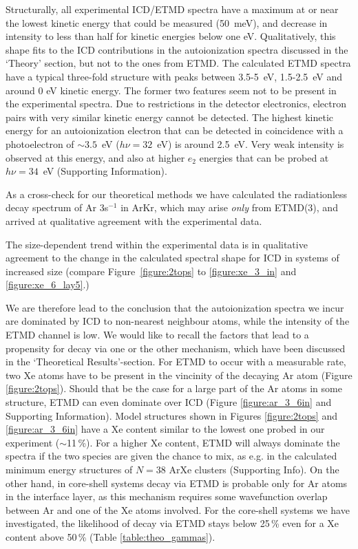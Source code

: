 Structurally, all experimental ICD/ETMD spectra have a maximum at or near the lowest kinetic energy that could be measured (50~meV), and decrease in intensity to less than half for kinetic energies below one eV. 
Qualitatively, this shape fits to the ICD contributions in the autoionization spectra discussed in the `Theory' section, but not to the ones from ETMD. 
The calculated ETMD spectra have a typical three-fold structure with peaks between 3.5-5~eV, 1.5-2.5~eV and around 0 eV kinetic energy. 
The former two features seem not to be present in the experimental spectra. 
Due to restrictions in the detector electronics, electron pairs with very similar kinetic energy cannot be detected. 
The highest kinetic energy for an autoionization electron that can be detected in coincidence with a photoelectron of $\sim3.5$~eV ($h\nu = 32$~eV) is around 2.5~eV.
Very weak intensity is observed at this energy, and also at higher $e_2$ energies that can be probed at $h\nu = 34$~eV (Supporting Information).

As a cross-check for our theoretical methods we have calculated the radiationless decay spectrum of Ar 3s$^{-1}$ in ArKr, which may arise {\it only} from ETMD(3),\cite{foerstel} and arrived at qualitative agreement with the experimental data.\cite{arkr}

The size-dependent trend within the experimental data is in qualitative agreement to the change in the calculated spectral shape for ICD in systems of increased size (compare Figure~\ref{figure:2tops} to \ref{figure:xe_3_in} and \ref{figure:xe_6_lay5}.)

We are therefore lead to the conclusion that the autoionization spectra we incur are dominated by ICD to non-nearest neighbour atoms, while the intensity of the ETMD channel is low. 
We would like to recall the factors that lead to a propensity for decay via one or the other mechanism, which have been discussed in the `Theoretical Results'-section.
For ETMD to occur with a measurable rate, two Xe atoms have to be present in the vincinity of the decaying Ar atom (Figure \ref{figure:2tops}).
Should that be the case for a large part of the Ar atoms in some structure, ETMD can even dominate over ICD (Figure \ref{figure:ar_3_6in} and Supporting Information).
Model structures shown in Figures \ref{figure:2tops} and \ref{figure:ar_3_6in} have a Xe content similar to the lowest one probed in our experiment ($\sim$11\,\%).
For a higher Xe content, ETMD will always dominate the spectra if the two species are given the chance to mix, as e.g. in the calculated minimum energy structures of $N=38$ ArXe clusters (Supporting Info).
On the other hand, in core-shell systems decay via ETMD is probable only for Ar atoms in the interface layer, as this mechanism requires some wavefunction overlap between Ar and one of the Xe atoms involved.
For the core-shell systems we have investigated, the likelihood of decay via ETMD stays below 25\,\% even for a Xe content above 50\,\% (Table \ref{table:theo_gammas}).

